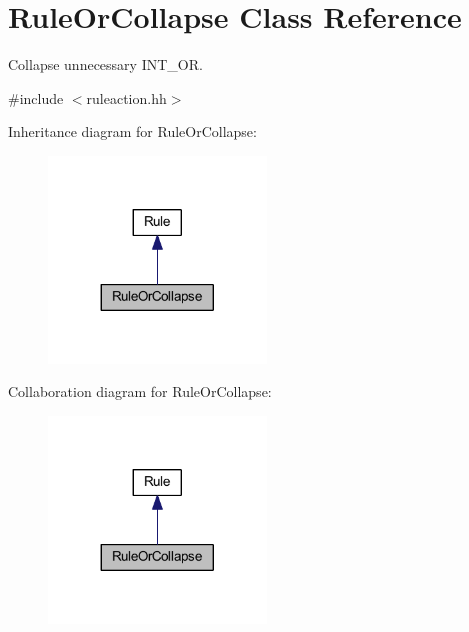 \hypertarget{class_rule_or_collapse}{}\section{Rule\+Or\+Collapse Class Reference}
\label{class_rule_or_collapse}


Collapse unnecessary I\+N\+T\+\_\+\+OR.  




{\ttfamily \#include $<$ruleaction.\+hh$>$}



Inheritance diagram for Rule\+Or\+Collapse\+:
\nopagebreak
\begin{figure}[H]
\begin{center}
\leavevmode
\includegraphics[width=164pt]{class_rule_or_collapse__inherit__graph}
\end{center}
\end{figure}


Collaboration diagram for Rule\+Or\+Collapse\+:
\nopagebreak
\begin{figure}[H]
\begin{center}
\leavevmode
\includegraphics[width=164pt]{class_rule_or_collapse__coll__graph}
\end{center}
\end{figure}
